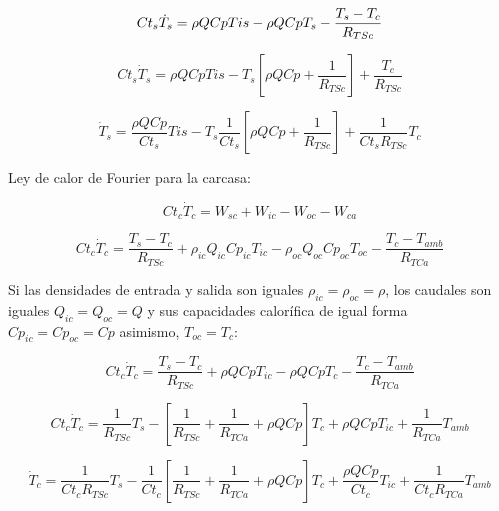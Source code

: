 \documentclass[12pt,letterpaper]{article}     %
\begin{document}
\begin{equation*}
Ct_{s} \dot T_{s} = \rho Q Cp T{is} - \rho Q Cp T_{s} - \frac{T_{s}-T_{c}}{R_{TSc}}\\
\end{equation*} 

\begin{equation*}
Ct_{s} \dot T_{s} = \rho Q Cp T{is} - T_{s} [\rho Q Cp + \frac{1}{R_{TSc}}] + \frac{T_{c}}{R_{TSc}}
\end{equation*} 

\begin{equation}
\dot T_{s} = \frac{\rho Q Cp}{Ct_{s}} T{is} - T_{s} \frac{1}{Ct_{s}} [\rho Q Cp + \frac{1}{R_{TSc}}] + \frac{1}{Ct_{s}R_{TSc}}T_{c}
     \label{eq:eqdifftempserpentin}
\end{equation}

Ley de calor de Fourier para la carcasa:

\begin{equation*} 
Ct_{c} \dot T_{c} = W_{sc} + W_{ic} - W_{oc} - W_{ca}
\end{equation*}

\begin{equation*} 
Ct_{c} \dot T_{c} = \frac{T_{s} - T_{c}}{R_{TSc}} + \rho_{ic}Q_{ic}Cp_{ic}T_{ic} - \rho_{oc}Q_{oc}Cp_{oc}T_{oc} - \frac{T_{c} - T_{amb}}{R_{TCa}}
\end{equation*}

Si las densidades de entrada y salida son iguales $\rho_{ic} = \rho_{oc} = \rho$, los caudales son iguales $Q_{ic} = Q_{oc} = Q $ y sus capacidades calorífica de igual forma $Cp_{ic} = Cp_{oc} = Cp$ asimismo, $T_{oc} = T_{c}$:

\begin{equation*} 
Ct_{c} \dot T_{c} = \frac{T_{s} - T_{c}}{R_{TSc}} +\rho Q Cp T_{ic} - \rho Q Cp T_{c} - \frac{T_{c} - T_{amb}}{R_{TCa}}
\end{equation*}

\begin{equation*} 
Ct_{c} \dot T_{c} = \frac{1}{R_{TSc}}T_{s} - [\frac{1}{R_{TSc}} + \frac{1}{R_{TCa}} + \rho Q Cp]T_{c} + \rho Q Cp T_{ic} + \frac{1}{R_{TCa}}T_{amb}
\end{equation*}

\begin{equation}
 \dot T_{c} = \frac{1}{Ct_{c}R_{TSc}}T_{s} - \frac{1}{Ct_{c}} [\frac{1}{R_{TSc}} + \frac{1}{R_{TCa}} + \rho Q Cp]T_{c} + \frac{\rho Q Cp}{Ct_{c}} T_{ic} + \frac{1}{Ct_{c}R_{TCa}}T_{amb}
     \label{eq:eqdifftempserpentin}
\end{equation}
\end{document}
